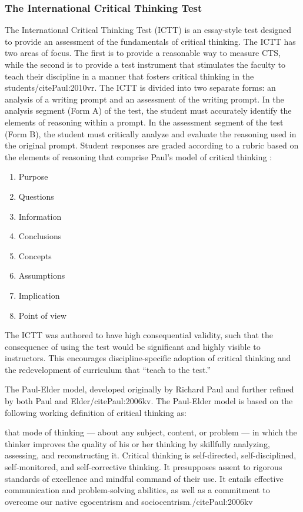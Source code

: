 \subsubsection{The International Critical Thinking Test}

The International Critical Thinking Test (ICTT) is an essay-style test designed to provide an assessment of the fundamentals of critical thinking. The ICTT has two areas of focus. The first is to provide a reasonable way to measure CTS, while the second is to provide a test instrument that stimulates the faculty to teach their discipline in a manner that fosters critical thinking in the students/cite{Paul:2010vr}. The ICTT is divided into two separate forms: an analysis of a writing prompt and an assessment of the writing prompt. In the analysis segment (Form A) of the test, the student must accurately identify the elements of reasoning within a prompt. In the assessment segment of the test (Form B), the student must critically analyze and evaluate the reasoning used in the original prompt. Student responses are graded according to a rubric based on the elements of reasoning that comprise Paul’s model of critical thinking \cite{Paul:2006kv}:

\begin{enumerate}
\item Purpose
\item Questions
\item Information
\item Conclusions
\item Concepts
\item Assumptions
\item Implication
\item Point of view
\end{enumerate}

The ICTT was authored to have high consequential validity, such that the consequence of using the test would be significant and highly visible to instructors\cite{Paul:2007um}. This encourages discipline-specific adoption of critical thinking and the redevelopment of curriculum that “teach to the test.”

The Paul-Elder model, developed originally by Richard Paul and further refined by both Paul and Elder/cite{Paul:2006kv}. The Paul-Elder model is based on the following working definition of critical thinking as:

that mode of thinking — about any subject, content, or problem — in which the thinker improves the quality of his or her thinking by skillfully analyzing, assessing, and reconstructing it. Critical thinking is self-directed, self-disciplined, self-monitored, and self-corrective thinking. It presupposes assent to rigorous standards of excellence and mindful command of their use. It entails effective communication and problem-solving abilities, as well as a commitment to overcome our native egocentrism and sociocentrism./cite{Paul:2006kv}

